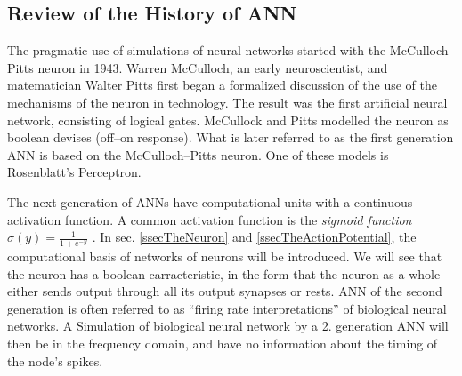 
\subsection{Review of the History of ANN}
\label{ssecHistoryOfANN}
The pragmatic use of simulations of neural networks started with the McCulloch--Pitts neuron in 1943. 
Warren McCulloch, an early neuroscientist, and matematician Walter Pitts first began a formalized discussion of the use of the mechanisms of the neuron in technology. %
The result was the first artificial neural network, consisting of logical gates. McCullock and Pitts modelled the neuron as boolean devises (off--on response)\cite{MccullochPittsHistorie}. 
What is later referred to as the first generation ANN is based on the McCulloch--Pitts neuron\cite{Maass97networksof}.
One of these models is Rosenblatt's Perceptron\cite{HaykinANNbok}.

The next generation of ANNs have computational units with a continuous activation function. 
A common activation function is the \emph{sigmoid function} $\sigma(y)=\frac{1}{1+e^{-y}}$ \cite{HaykinANNbok}.
In sec. \ref{ssecTheNeuron} and \ref{ssecTheActionPotential}, the computational basis of networks of neurons will be introduced. 
We will see that the neuron has a boolean carracteristic, in the form that the neuron as a whole either sends output through all its output synapses or rests. 
%
ANN of the second generation is often referred to as ``firing rate interpretations'' of biological neural networks\cite{Maass97networksof}.
A Simulation of biological neural network by a 2. generation ANN will then be in the frequency domain, and have no information about the timing of the node's spikes.



